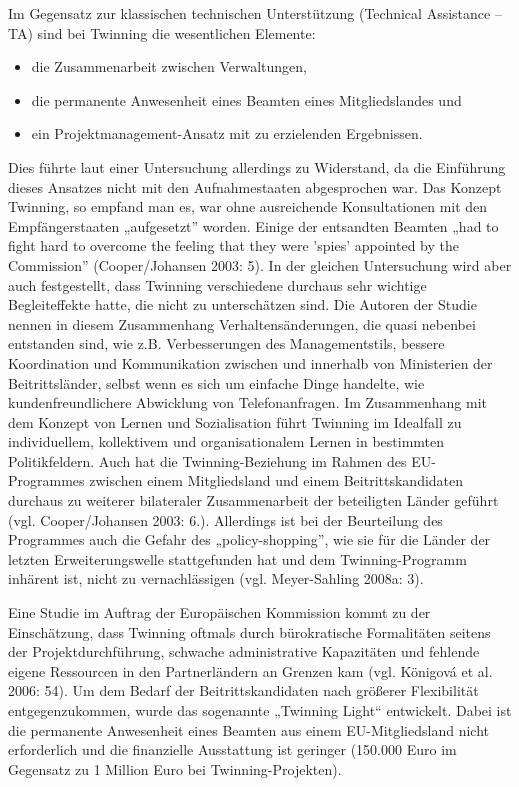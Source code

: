 Im Gegensatz zur klassischen technischen Unterstützung (Technical Assistance – TA) sind bei Twinning die wesentlichen Elemente:
\begin{itemize}
\item die Zusammenarbeit zwischen Verwaltungen, 
\item die permanente Anwesenheit eines Beamten eines Mitgliedslandes und
\item ein Projektmanagement-Ansatz mit zu erzielenden Ergebnissen. 
\end{itemize}
Dies führte laut einer Untersuchung allerdings zu Widerstand, da die Einführung dieses Ansatzes nicht mit den Aufnahmestaaten abgesprochen war. Das Konzept Twinning, so empfand man es, war ohne ausreichende Konsultationen mit den Empfängerstaaten „aufgesetzt” worden. Einige der entsandten Beamten „had to fight hard to overcome the feeling that they were 'spies' appointed by the Commission” (Cooper/Johansen 2003: 5). In der gleichen Untersuchung wird aber auch festgestellt, dass Twinning verschiedene durchaus sehr wichtige Begleiteffekte hatte, die nicht zu unterschätzen sind. Die Autoren der Studie nennen in diesem Zusammenhang Verhaltensänderungen, die quasi nebenbei entstanden sind, wie z.B. Verbesserungen des Managementstils, bessere Koordination und Kommunikation zwischen und innerhalb von Ministerien der Beitrittsländer, selbst wenn es sich um einfache Dinge handelte, wie kundenfreundlichere Abwicklung von Telefonanfragen. Im Zusammenhang mit dem Konzept von Lernen und Sozialisation führt Twinning im Idealfall zu individuellem, kollektivem und organisationalem Lernen in bestimmten Politikfeldern. Auch hat die Twinning-Beziehung im Rahmen des EU-Programmes zwischen einem Mitgliedsland und einem Beitrittskandidaten durchaus zu weiterer bilateraler Zusammenarbeit der beteiligten Länder geführt (vgl. Cooper/Johansen 2003: 6.). Allerdings ist bei der Beurteilung des Programmes auch die Gefahr des „policy-shopping”, wie sie für die Länder der letzten Erweiterungswelle stattgefunden hat und dem Twinning-Programm inhärent ist, nicht zu vernachlässigen (vgl. Meyer-Sahling 2008a: 3).\par
Eine Studie im Auftrag der Europäischen Kommission kommt zu der Einschätzung, dass Twinning oftmals durch bürokratische Formalitäten seitens der Projektdurchführung, schwache administrative Kapazitäten und fehlende eigene Ressourcen in den Partnerländern an Grenzen kam (vgl. Königová et al. 2006: 54). Um dem Bedarf der Beitrittskandidaten nach größerer Flexibilität entgegenzukommen, wurde das sogenannte „Twinning Light“ entwickelt. Dabei ist die permanente Anwesenheit eines Beamten aus einem EU-Mitgliedsland nicht erforderlich und die finanzielle Ausstattung ist geringer (150.000 Euro im Gegensatz zu 1 Million Euro bei Twinning-Projekten).\par
